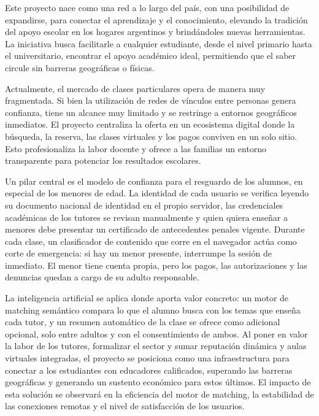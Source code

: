 %

\begin{resumen}

Este proyecto nace como una red a lo largo del país, con una posibilidad
de expandirse, para conectar el aprendizaje y el conocimiento, elevando
la tradición del apoyo escolar en los hogares argentinos y brindándoles
nuevas herramientas. La iniciativa busca facilitarle a cualquier
estudiante, desde el nivel primario hasta el universitario, encontrar el
apoyo académico ideal, permitiendo que el saber circule sin barreras
geográficas o físicas.

Actualmente, el mercado de clases particulares opera de manera muy
fragmentada. Si bien la utilización de redes de vínculos entre personas
genera confianza, tiene un alcance muy limitado y se restringe a
entornos geográficos inmediatos. El proyecto centraliza la oferta en un
ecosistema digital donde la búsqueda, la reserva, las clases virtuales
y los pagos conviven en un solo sitio. Esto profesionaliza la labor
docente y ofrece a las familias un entorno transparente para potenciar
los resultados escolares.

Un pilar central es el modelo de confianza para el resguardo de los
alumnos, en especial de los menores de edad. La identidad de cada
usuario se verifica leyendo su documento nacional de identidad en el
propio servidor, las credenciales académicas de los tutores se revisan
manualmente y quien quiera enseñar a menores debe presentar un
certificado de antecedentes penales vigente. Durante cada clase, un
clasificador de contenido que corre en el navegador actúa como corte de
emergencia: si hay un menor presente, interrumpe la sesión de
inmediato. El menor tiene cuenta propia, pero los pagos, las
autorizaciones y las denuncias quedan a cargo de su adulto responsable.

La inteligencia artificial se aplica donde aporta valor concreto: un
motor de matching semántico compara lo que el alumno busca con los
temas que enseña cada tutor, y un resumen automático de la clase se
ofrece como adicional opcional, solo entre adultos y con el
consentimiento de ambos. Al poner en valor la labor de los tutores,
formalizar el sector y sumar reputación dinámica y aulas virtuales
integradas, el proyecto se posiciona como una infraestructura para
conectar a los estudiantes con educadores calificados, superando las
barreras geográficas y generando un sustento económico para estos
últimos. El impacto de esta solución se observará en la eficiencia del
motor de matching, la estabilidad de las conexiones remotas y el nivel
de satisfacción de los usuarios.

\end{resumen}
